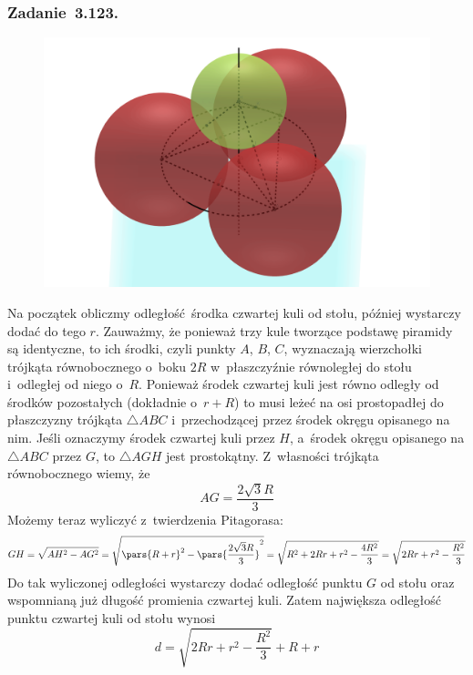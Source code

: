 \subsubsection*{Zadanie~3.123.}
\begin{figure}[H]
    \centering
    \includegraphics[width=\textwidth]{img/2021_02_24/123/space.png}
\end{figure}
Na początek obliczmy odległość środka czwartej kuli od stołu, później wystarczy dodać do tego \(r\). Zauważmy, że ponieważ trzy kule tworzące podstawę piramidy są identyczne, to ich środki, czyli punkty \(A\), \(B\), \(C\), wyznaczają wierzchołki trójkąta równobocznego o~boku \(2R\) w~płaszczyźnie równoległej do stołu i~odległej od niego o~\(R\). Ponieważ środek czwartej kuli jest równo odległy od środków pozostałych (dokładnie o~\(r + R\)) to musi leżeć na osi prostopadłej do płaszczyzny trójkąta \(\triangle{ABC}\) i~przechodzącej przez środek okręgu opisanego na nim. Jeśli oznaczymy środek czwartej kuli przez \(H\), a~środek okręgu opisanego na \(\triangle{ABC}\) przez \(G\), to \(\triangle{AGH}\) jest prostokątny. Z~własności trójkąta równobocznego wiemy, że
\begin{equation*}
    AG = \frac{2\sqrt{3}R}{3}
\end{equation*}
Możemy teraz wyliczyć z~twierdzenia Pitagorasa:
\begin{equation*}
    GH
    = \sqrt{AH^2 - AG^2}
    = \sqrt{\pars{R + r}^2 - \pars{\frac{2\sqrt{3}R}{3}}^2}
    = \sqrt{R^2 + 2Rr + r^2 - \frac{4R^2}{3}}
    = \sqrt{2Rr + r^2 - \frac{R^2}{3}}
\end{equation*}
Do tak wyliczonej odległości wystarczy dodać odległość punktu \(G\) od stołu oraz wspomnianą już długość promienia czwartej kuli. Zatem największa odległość punktu czwartej kuli od stołu wynosi
\begin{equation*}
    d = \sqrt{2Rr + r^2 - \frac{R^2}{3}} + R + r
\end{equation*}
